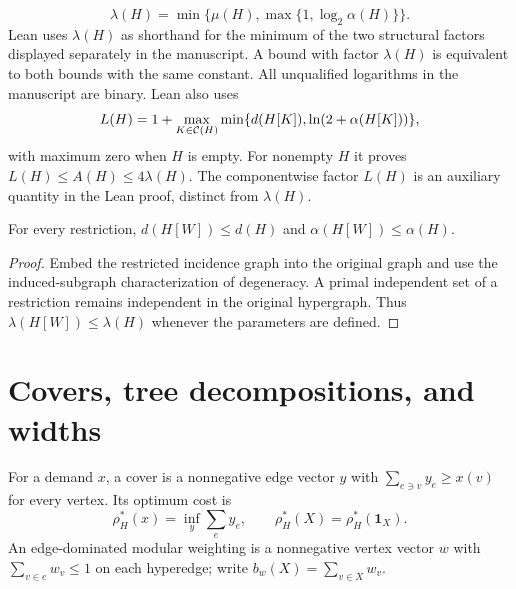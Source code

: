 \begin{definition}
\label{eq:lambda-intro}
\leanok
\[
 \lambda(H)=\min\{\mu(H),\max\{1,\log_2\alpha(H)\}\}.
\]
Lean uses $\lambda(H)$ as shorthand for the minimum of the two structural
factors displayed separately in the manuscript. A bound with factor
$\lambda(H)$ is equivalent to both bounds with the same constant.
All unqualified logarithms in the manuscript are binary. Lean also uses
\[
 L(H)=1+\max_{K\in\mathcal C(H)}
  \min\{d(H[K]),\ln(2+\alpha(H[K]))\},
\]
with maximum zero when $H$ is empty. For nonempty $H$ it proves
$L(H)\le A(H)\le4\lambda(H)$. The componentwise factor $L(H)$ is an
auxiliary quantity in the Lean proof, distinct from $\lambda(H)$.
\end{definition}

\begin{lemma}
\label{eq:hereditary-structure}
\leanok
For every restriction, $d(H[W])\le d(H)$ and
$\alpha(H[W])\le\alpha(H)$.
\end{lemma}
\begin{proof}\leanok
Embed the restricted incidence graph into the original graph and use the
induced-subgraph characterization of degeneracy. A primal independent set
of a restriction remains independent in the original hypergraph. Thus
$\lambda(H[W])\le\lambda(H)$ whenever the parameters are defined.
\end{proof}

\section{Covers, tree decompositions, and widths}

\begin{definition}
\label{def:cover}
\leanok
For a demand $x$, a cover is a nonnegative edge vector $y$ with
$\sum_{e\ni v}y_e\ge x(v)$ for every vertex. Its optimum cost is
\[
 \rho_H^*(x)=\inf_y\sum_e y_e,
 \qquad \rho_H^*(X)=\rho_H^*(\mathbf1_X).
\]
An edge-dominated modular weighting is a nonnegative vertex vector $w$ with
$\sum_{v\in e}w_v\le1$ on each hyperedge; write
$b_w(X)=\sum_{v\in X}w_v$.
\end{definition}

